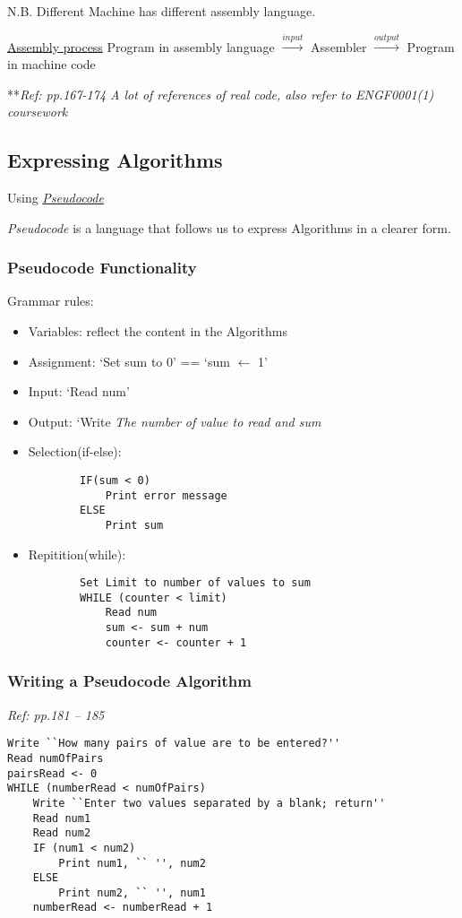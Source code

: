\documentclass[12pt]{article}
\begin{document}
N.B. Different Machine has different assembly language.

\underline{Assembly process}\newline
Program in assembly language $\xrightarrow{input}$ Assembler $\xrightarrow{output}$ Program in machine code

**\emph{Ref: pp.167-174 A lot of references of real code, also refer to ENGF0001(1) coursework}

\subsection{Expressing Algorithms}
Using \underline{\textit{Pseudocode}}

\emph{Pseudocode} is a language that follows us to express Algorithms in a clearer form.

\subsubsection{Pseudocode Functionality}
Grammar rules:
\begin{itemize}
    \item Variables: reflect the content in the Algorithms
    \item Assignment: `Set sum to 0' == `sum $\leftarrow$ 1'
    \item Input: `Read num'
    \item Output: `Write \textit{The number of value to read and sum}
    \item Selection(if-else):
    \begin{lstlisting}
        IF(sum < 0)
            Print error message
        ELSE
            Print sum
    \end{lstlisting}
    \item Repitition(while):
    \begin{lstlisting}
        Set Limit to number of values to sum
        WHILE (counter < limit)
            Read num
            sum <- sum + num
            counter <- counter + 1
    \end{lstlisting}
\end{itemize}

\subsubsection{Writing a Pseudocode Algorithm}
\textit{Ref: pp.181 -- 185}
\begin{lstlisting}
Write ``How many pairs of value are to be entered?''
Read numOfPairs
pairsRead <- 0
WHILE (numberRead < numOfPairs)
    Write ``Enter two values separated by a blank; return''
    Read num1
    Read num2
    IF (num1 < num2)
        Print num1, `` '', num2
    ELSE
        Print num2, `` '', num1
    numberRead <- numberRead + 1
\end{lstlisting}
\end{document}
